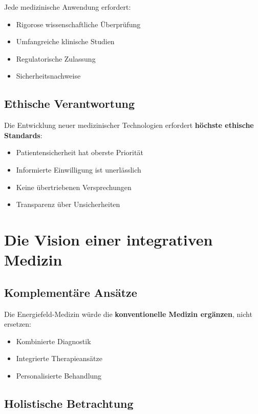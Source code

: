 \documentclass[12pt,a4paper]{report}
\begin{document}
	Jede medizinische Anwendung erfordert:
	
	\begin{itemize}
		\item Rigorose wissenschaftliche Überprüfung
		\item Umfangreiche klinische Studien
		\item Regulatorische Zulassung
		\item Sicherheitsnachweise
	\end{itemize}
	
	\subsection{Ethische Verantwortung}
	
	Die Entwicklung neuer medizinischer Technologien erfordert \textbf{höchste ethische Standards}:
	
	\begin{itemize}
		\item Patientensicherheit hat oberste Priorität
		\item Informierte Einwilligung ist unerlässlich
		\item Keine übertriebenen Versprechungen
		\item Transparenz über Unsicherheiten
	\end{itemize}
	
	\section{Die Vision einer integrativen Medizin}
	
	\subsection{Komplementäre Ansätze}
	
	Die Energiefeld-Medizin würde die \textbf{konventionelle Medizin ergänzen}, nicht ersetzen:
	
	\begin{itemize}
		\item Kombinierte Diagnostik
		\item Integrierte Therapieansätze
		\item Personalisierte Behandlung
	\end{itemize}
	
	\subsection{Holistische Betrachtung}
	
\end{document}
